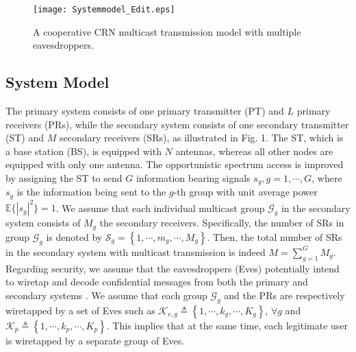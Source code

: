 \documentclass[journal,twoside]{IEEEtran}
\begin{document}
\begin{figure}[t]
\centering
\texttt{[image: Systemmodel\_Edit.eps]}
\caption{A cooperative CRN multicast transmission  model with multiple eavesdroppers.}
\label{fig:zoneselect}
\end{figure}
\subsection{System  Model} \label{Cognitive Radio Network}
 The primary system consists of one primary transmitter (PT) and $L$ primary receivers (PRs), while the secondary system consists of one secondary transmitter  (ST) and $M$ secondary receivers (SRs),  as illustrated in Fig. 1.   The ST, which is a base station (BS),  is equipped with $N$ antennas,  whereas all  other nodes are equipped with only one antenna.  The opportunistic spectrum access is improved by assigning the ST  to send  $G$ information bearing signals $s_g, g=1, \cdots, G$, where $s_g$ is the information being sent to the $g$-th group  with unit average power $\mathbb{E}\{\left|s_g\right|^2\}=1$.  We assume that each individual multicast group $\mathcal{G}_g$ in the secondary system consists of $M_g$ the secondary receivers. Specifically, the number of  SRs in  group $\mathcal{G}_g$ is denoted by $\mathcal{S}_g=\left\{1,\cdots, m_g,\cdots, M_g\right\}$. Then, the total number of SRs  in the secondary system with multicast transmission is indeed $M=\sum_{g=1}^GM_g$.  
Regarding security, we assume that the eavesdroppers (Eves) potentially intend to wiretap and decode confidential messages from both the primary  and  secondary systems \cite{Mokari}.  We assume that each group $\mathcal{G}_g$ and the PRs are respectively wiretapped by a set of Eves such as $\mathcal{K}_{e,g}\triangleq\left\{1,\cdots,k_g,\cdots,K_g\right\}$, $\forall g$ and $\mathcal{K}_{p}\triangleq\left\{1,\cdots,k_p,\cdots,K_p\right\}$. This implies that at the same time, each legitimate user is wiretapped by a separate  group of Eves.
\end{document}
